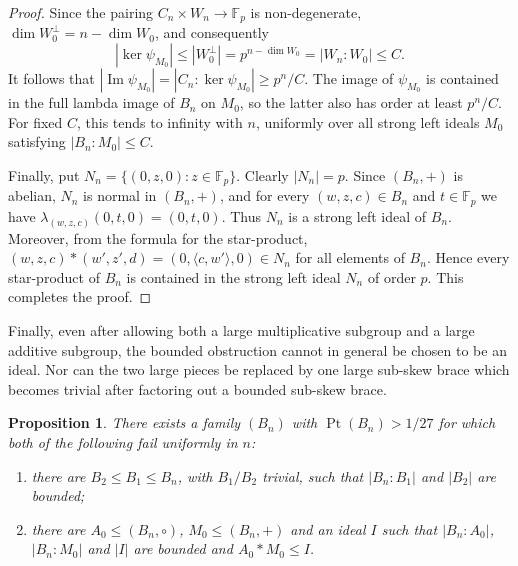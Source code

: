\documentclass[11pt, oneside]{amsart}
\numberwithin{equation}{section}
\theoremstyle{plain}
\newtheorem{pro}[equation]{Proposition}
\theoremstyle{definition}
\newcommand{\Pt}{\operatorname{Pt} }
\begin{document}
\begin{proof}
Since the pairing $C_n\times W_n\to\mathbb F_p$ is non-degenerate,
$\dim W_0^\perp=n-\dim W_0$, and consequently
$$
|\ker\psi_{M_0}|
\leqslant |W_0^\perp|
=p^{n-\dim W_0}
=|W_n:W_0|
\leqslant C.
$$
It follows that
$|\operatorname{Im}\psi_{M_0}|
=|C_n:\ker\psi_{M_0}|
\geqslant p^n/C$.
The image of $\psi_{M_0}$ is contained in the full lambda image of $B_n$ on $M_0$, so the latter also has order at least $p^n/C$. For fixed $C$, this tends to infinity with $n$, uniformly over all strong left ideals $M_0$ satisfying $|B_n:M_0|\leqslant C$.

Finally, put
$N_n=\{(0,z,0):z\in\mathbb F_p\}$. Clearly $|N_n|=p$. Since $(B_n,+)$ is abelian, $N_n$ is normal in $(B_n,+)$, and for every $(w,z,c)\in B_n$ and $t\in\mathbb F_p$ we have
$\lambda_{(w,z,c)}(0,t,0)=(0,t,0)$. Thus $N_n$ is a strong left ideal of $B_n$. Moreover, from the formula for the star-product,
$(w,z,c)*(w',z',d)=(0,\langle c,w'\rangle,0)\in N_n$
for all elements of $B_n$. Hence every star-product of $B_n$ is contained in the strong left ideal $N_n$ of order $p$. This completes the proof.
\end{proof}

Finally, even after allowing both a large multiplicative subgroup and a
large additive subgroup, the bounded obstruction cannot in general be
chosen to be an ideal. Nor can the two large pieces be replaced by one
large sub-skew brace which becomes trivial after factoring out a bounded
sub-skew brace.

\begin{pro} %
There exists a family $(B_n)$ with $\Pt(B_n)>1/27$ for which both of the
following fail uniformly in $n$:
\begin{enumerate}
\item there are $B_2\leqslant B_1\leqslant B_n$, with $B_1/B_2$
trivial, such that $|B_n:B_1|$ and $|B_2|$ are bounded;
\item there are $A_0\leqslant(B_n,\circ)$, $M_0\leqslant(B_n,+)$ and
an ideal $I$ such that $|B_n:A_0|$, $|B_n:M_0|$ and $|I|$ are bounded
and $A_0*M_0\leqslant I$.
\end{enumerate}
\end{pro}
\end{document}
